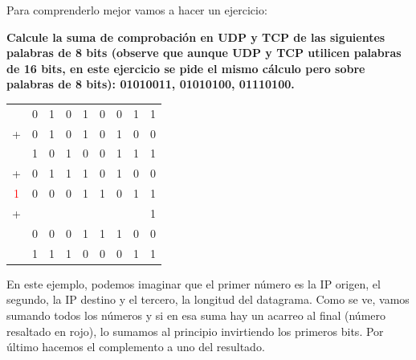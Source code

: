 \documentclass[10pt,a4paper,spanish]{report}
\begin{document}
Para comprenderlo mejor vamos a hacer un ejercicio:

\textbf{Calcule la suma de comprobación en UDP y TCP de las siguientes palabras de 8 bits (observe que aunque UDP y TCP utilicen palabras de 16 bits, en este ejercicio se pide el mismo cálculo pero sobre palabras de 8 bits): 01010011, 01010100, 01110100.}

\begin{center}
\begin{tabular}{c c c c c c c c c}
& 0 & 1 & 0 & 1 & 0 & 0 & 1 & 1 \\
+ & 0 & 1 & 0 & 1 & 0 & 1 & 0 & 0 \\
\hline
& 1 & 0 & 1 & 0 & 0 & 1 & 1 & 1 \\
+ & 0 & 1 & 1 & 1 & 0 & 1 & 0 & 0 \\
\hline
\textcolor{red}{1} & 0 & 0 & 0 & 1 & 1 & 0 & 1 & 1 \\
+ & & & & & & & & 1 \\
\hline
& 0 & 0 & 0 & 1 & 1 & 1 & 0 & 0 \\
\hline
& 1 & 1 & 1 & 0 & 0 & 0 & 1 & 1 \\
\end{tabular}
\end{center}

En este ejemplo, podemos imaginar que el primer número es la IP origen, el segundo, la IP destino y el tercero, la longitud del datagrama. Como se ve, vamos sumando todos los números y si en esa suma hay un acarreo al final (número resaltado en rojo), lo sumamos al principio invirtiendo los primeros bits. Por último hacemos el complemento a uno del resultado.
\end{document}
